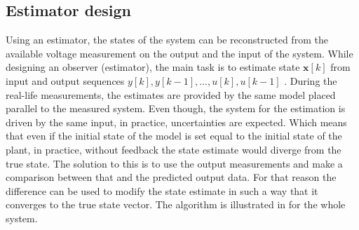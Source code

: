 \subsection{Estimator design}
\label{estimator}

Using an estimator, the states of the system can be reconstructed from the available voltage measurement on the output and the input of the system. While designing an observer (estimator), the main task is to estimate state $\mathbf{x}[k]$ from input and output sequences $y[k], y[k-1],..., u[k], u[k-1]$ .
During the real-life measurements, the estimates are provided by the same model placed parallel to the measured system. Even though, the system for the estimation is driven by the same input, in practice, uncertainties are expected. Which means that even if the initial state of the model is set equal to the initial state of the plant, in practice, without feedback the state estimate would diverge from the true state. The solution to this is to use the output measurements and make a comparison between that and the predicted output data. For that reason the difference can be used to modify the state estimate in such a way that it converges to the true state vector. The algorithm is illustrated in  for the whole system.


